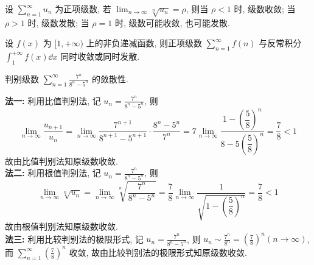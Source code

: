 \begin{theorem}[根值审敛法]
    设 $\displaystyle \sum_{n=1}^{\infty} u_{n} $ 为正项级数, 若 $\displaystyle \lim _{n \rightarrow \infty} \sqrt[n]{u_{n}}=\rho $, 则当 $ \rho<1 $ 时, 级数收敛;
    当 $ \rho>1 $ 时, 级数发散; 当 $ \rho=1 $ 时, 级数可能收敛, 也可能发散.
\end{theorem}

\begin{theorem}[积分判别法]
    设 $ f(x) $ 为 $ [1,+\infty) $ 上的非负递减函数, 则正项级数 $\displaystyle  \sum_{n=1}^{\infty} f(n) $ 与反常积分 $\displaystyle \int_{1}^{+\infty} f(x) \dd x $ 同时收敛或同时发散.
\end{theorem}

\begin{example}
    判别级数 $\displaystyle \sum_{n=1}^{\infty} \frac{7^{n}}{8^{n}-5^{n}} $ 的敛散性.
\end{example}
\begin{solution}
    \textbf{法一: }利用比值判别法, 记 $\displaystyle u_{n}=\frac{7^{n}}{8^{n}-5^{n}} $, 则 $$\displaystyle \lim _{n \rightarrow \infty} \frac{u_{n+1}}{u_{n}}=\lim _{n \rightarrow \infty} \dfrac{7^{n+1}}{8^{n+1}-5^{n+1}} \cdot \dfrac{8^{n}-5^{n}}{7^{n}}=7 \lim _{n \rightarrow \infty} \frac{1-\left(\dfrac{5}{8}\right)^{n}}{8-5\left(\dfrac{5}{8}\right)^{n}}=\frac{7}{8}<1 $$
    故由比值判别法知原级数收敛.\\
    \textbf{法二: }利用根值判别法, 记 $\displaystyle u_{n}=\frac{7^{n}}{8^{n}-5^{n}} $, 则
    $$\lim _{n \rightarrow \infty} \sqrt[n]{u_{n}}=\lim _{n \rightarrow \infty} \sqrt[n]{\frac{7^{n}}{8^{n}-5^{n}}}=\frac{7}{8} \lim _{n \rightarrow \infty} \frac{1}{\sqrt{1-\left(\dfrac{5}{8}\right)^{n}}}=\frac{7}{8}<1$$
    故由根值判别法知原级数收敛.\\
    \textbf{法三: }利用比较判别法的极限形式, 记 $\displaystyle u_{n}=\frac{7^{n}}{8^{n}-5^{n}} $, 则 $\displaystyle u_{n} \sim \frac{7^{n}}{8^{n}}=\left(\frac{7}{8}\right)^{n}(n \rightarrow \infty) $, 而 $\displaystyle \sum_{n=1}^{\infty}\left(\frac{7}{8}\right)^{n} $ 收敛, 故由比较判别法的极限形式知原级数收敛.
\end{solution}


